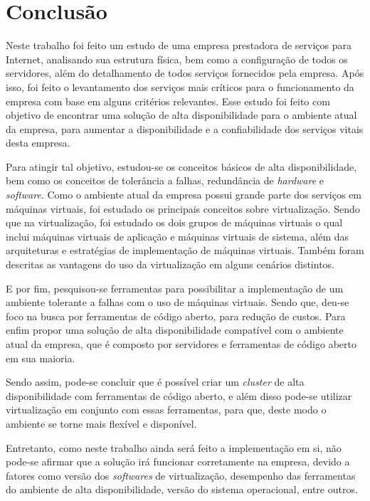 \chapter{Conclusão}
\label{cap:conclusao}

Neste trabalho foi feito um estudo de uma empresa prestadora de serviços para Internet, analisando sua estrutura física, bem como a configuração
de todos os servidores, além do detalhamento de todos serviços fornecidos pela empresa. Após isso, foi feito o levantamento dos serviços mais 
críticos para o funcionamento da empresa com base em alguns critérios relevantes. Esse estudo foi feito com objetivo de encontrar 
uma solução de alta disponibilidade para o ambiente atual da empresa, para aumentar a disponibilidade e a confiabilidade dos serviços vitais desta 
empresa.

Para atingir tal objetivo, estudou-se os conceitos básicos de alta disponibilidade, bem como os conceitos de tolerância a falhas, redundância de
\textit{hardware} e \textit{software}. Como o ambiente atual da empresa possui grande parte dos serviços em máquinas virtuais, foi estudado
os principais conceitos sobre virtualização. Sendo que na virtualização, foi estudado os dois grupos de máquinas virtuais o qual inclui máquinas 
virtuais de aplicação e máquinas virtuais de sistema, além das arquiteturas e estratégias de implementação de máquinas virtuais. Também foram 
descritas as vantagens do uso da virtualização em alguns cenários distintos.

E por fim, pesquisou-se ferramentas para possibilitar a implementação de um ambiente tolerante a falhas com o uso de máquinas virtuais.
Sendo que, deu-se foco na busca por ferramentas de código aberto, para redução de custos. Para enfim propor uma solução de alta disponibilidade 
compatível com o ambiente atual da empresa, que é composto por servidores e ferramentas de código aberto em sua maioria.

Sendo assim, pode-se concluir que é possível criar um \textit{cluster} de alta disponibilidade com ferramentas de código aberto, e além disso 
pode-se utilizar virtualização em conjunto com essas ferramentas, para que, deste modo o ambiente se torne mais flexível e disponível. 

Entretanto, como neste trabalho ainda será feito a implementação em si, não pode-se afirmar que a solução irá funcionar corretamente
na empresa, devido a fatores como versão dos \textit{softwares} de virtualização, desempenho das ferramentas do ambiente de alta disponibilidade, 
versão do sistema operacional, entre outros.

